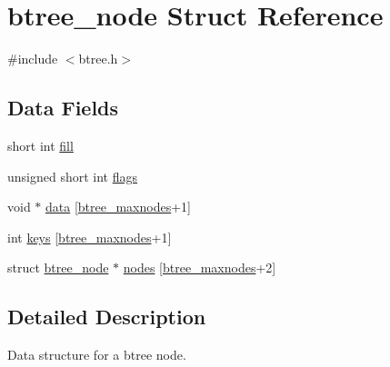 \hypertarget{structbtree__node}{\section{btree\-\_\-node Struct Reference}
\label{structbtree__node}
}


{\ttfamily \#include $<$btree.\-h$>$}

\subsection*{Data Fields}
\begin{DoxyCompactItemize}
\item 
short int \hyperlink{structbtree__node_a3848efec9b1ebaf57b640bab5471a270}{fill}
\item 
unsigned short int \hyperlink{structbtree__node_ae718cba7f740adbac78a900ce25b73af}{flags}
\item 
void $\ast$ \hyperlink{structbtree__node_a3cfab63ed223a4bd84e8d785a0e3d9ef}{data} \mbox{[}\hyperlink{btree_8h_ae3d7fe3fe8f11c20bc5133561bb6178c}{btree\-\_\-maxnodes}+1\mbox{]}
\item 
int \hyperlink{structbtree__node_acd615dd3caebe0bb636e606f308ad51b}{keys} \mbox{[}\hyperlink{btree_8h_ae3d7fe3fe8f11c20bc5133561bb6178c}{btree\-\_\-maxnodes}+1\mbox{]}
\item 
struct \hyperlink{structbtree__node}{btree\-\_\-node} $\ast$ \hyperlink{structbtree__node_ae6d749deeab477d1ebbca6ed1033da3c}{nodes} \mbox{[}\hyperlink{btree_8h_ae3d7fe3fe8f11c20bc5133561bb6178c}{btree\-\_\-maxnodes}+2\mbox{]}
\end{DoxyCompactItemize}


\subsection{Detailed Description}
Data structure for a btree node. 

